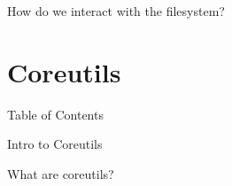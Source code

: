 \documentclass{beamer}
\begin{document}
\begin{frame}
	\begin{center}
		\Huge How do we interact with the filesystem?
	\end{center}
\end{frame}

\section{Coreutils}
\begin{frame}{Table of Contents}
	\tableofcontents[currentsection]
\end{frame}

\begin{frame}{Intro to Coreutils}
	\begin{center}
		\Huge What are coreutils?
	\end{center}
\end{frame}
\end{document}
